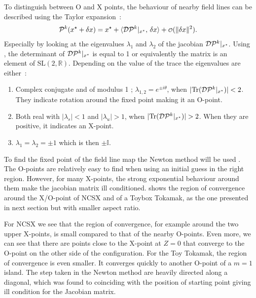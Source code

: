 To distinguish between O and X points, the behaviour of nearby field lines can be described using the Taylor expansion~:
\begin{equation*}
    \pmap^k(\z^\star+\delta \z) = \z^\star + \langle\dpmap^k\vert_{\z^\star},\, \delta\z\rangle + \smallO(\Vert\delta\z\Vert^2).
\end{equation*}
Especially by looking at the eigenvalues $\lambda_1$ and $\lambda_2$ of the jacobian $\mathcal{D}\mathcal{P}^k\vert_{x^\star}$. Using , the determinant of $\mathcal{D}\mathcal{P}^k\vert_{x^\star}$  is equal to 1 or equivalently the matrix is an element of $\text{SL}(2,\mathbb{R})$. Depending on the value of the trace the eigenvalues are either~:
\begin{enumerate}
    \item Complex conjugate and of modulus 1 ; $\lambda_{1,2} = e^{\pm i\theta}$, when $\vert \text{Tr}(\mathcal{D}\mathcal{P}^k\vert_{x^\star})\vert < 2$. They indicate rotation around the fixed point making it an O-point.
    \item Both real with $\vert\lambda_s\vert < 1$ and $\vert\lambda_u\vert > 1$, when $\vert \text{Tr}(\mathcal{D}\mathcal{P}^k\vert_{x^\star})\vert > 2$. When they are positive, it indicates an X-point.
    \item $\lambda_1 = \lambda_2 = \pm 1$ which is then $\pm \mathbb{I}$.
\end{enumerate}

To find the fixed point of the field line map the Newton method will be used . The O-points are relatively easy to find when using an initial guess in the right region. However, for many X-points, the strong exponential behaviour around them make the jacobian matrix ill conditioned.  shows the region of convergence around the X/O-point of NCSX and of a Toybox Tokamak, as the one presented in next section but with smaller aspect ratio.

For NCSX we see that the region of convergence, for example around the two upper X-points, is small compared to that of the nearby O-points. Even more, we can see that there are points close to the X-point at $Z = 0$ that converge to the O-point on the other side of the configuration. For the Toy Tokamak, the region of convergence is even smaller. It converges quickly to another O-point of a $m = 1$ island. The step taken in the Newton method are heavily directed along a diagonal, which was found to coinciding with the position of starting point giving ill condition for the Jacobian matrix.

